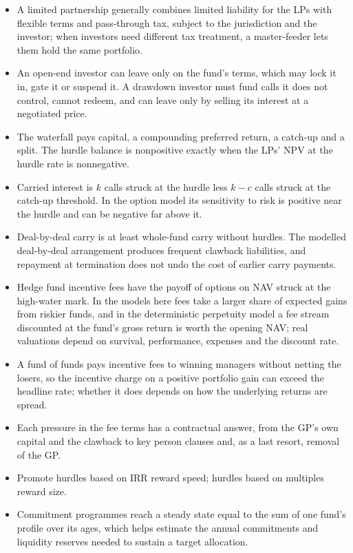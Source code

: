 \begin{chapterrefs}
\begin{itemize}
  \item A limited partnership generally combines limited liability for the LPs with flexible terms and
        pass-through tax, subject to the jurisdiction and the investor; when
        investors need different tax treatment, a master-feeder lets them hold the same portfolio.
  \item An open-end investor can leave only on the fund's terms, which may lock it in, gate it or
        suspend it. A drawdown investor must fund calls it does not control, cannot redeem, and can
        leave only by selling its interest at a negotiated price.
  \item The waterfall pays capital, a compounding preferred return, a catch-up and a split. The
        hurdle balance is nonpositive exactly when the LPs' NPV at the hurdle rate is nonnegative.
  \item Carried interest is $k$ calls struck at the hurdle less $k-c$ calls struck at the catch-up
        threshold. In the option model its sensitivity to risk is positive near the hurdle and can be
        negative far above it.
  \item Deal-by-deal carry is at least whole-fund carry without hurdles. The modelled deal-by-deal
        arrangement produces frequent clawback liabilities, and repayment at termination does not
        undo the cost of earlier carry payments.
  \item Hedge fund incentive fees have the payoff of options on NAV struck at the high-water mark. In the
        models here fees take a larger share of expected gains from riskier funds, and in the deterministic perpetuity model a fee
        stream discounted at the fund's gross return is worth the opening NAV; real valuations depend
        on survival, performance, expenses and the discount rate.
  \item A fund of funds pays incentive fees to winning managers without netting the losers, so the
        incentive charge on a positive portfolio gain can exceed the headline rate; whether it does
        depends on how the underlying returns are spread.
  \item Each pressure in the fee terms has a contractual answer, from the GP's own capital and the
        clawback to key person clauses and, as a last resort, removal of the GP.
  \item Promote hurdles based on IRR reward speed; hurdles based on multiples reward size.
  \item Commitment programmes reach a steady state equal to the sum of one fund's profile over its ages,
        which helps estimate the annual commitments and liquidity reserves needed to sustain a target
        allocation.
\end{itemize}


\end{chapterrefs}
